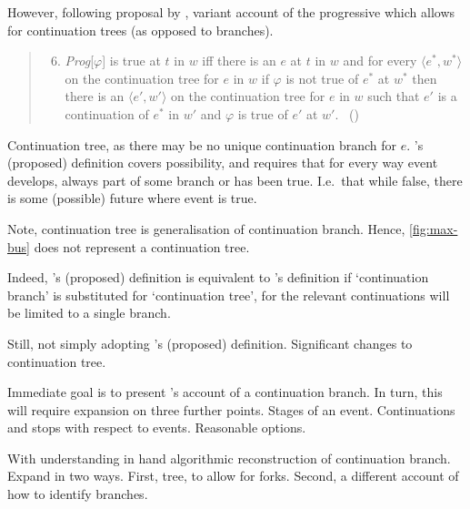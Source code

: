 \begin{note}
  However, following proposal by \citeauthor{Szabo:2004ul}, variant account of the progressive which allows for continuation trees (as opposed to branches).

  \begin{quote}
    \begin{enumerate}[label=(\Roman*), ref=(\Roman*)]
      \setcounter{enumi}{5}
    \item
      \emph{Prog}[\(\varphi\)] is true at \(t\) in \(w\) iff there is an \(e\) at \(t\) in \(w\) and for every \(\langle e^{\ast}, w^{\ast} \rangle\) on the continuation tree for \(e\) in \(w\) if \(\varphi\) is not true of \(e^{\ast}\) at \(w^{\ast}\) then there is an \(\langle e', w' \rangle\) on the continuation tree for \(e\) in \(w\) such that \(e'\) is a continuation of \(e^{\ast}\) in \(w'\) and \(\varphi\) is true of \(e'\) at \(w'\).%
      \mbox{ }\hfill\mbox{(\citeyear[37]{Szabo:2004ul})}
    \end{enumerate}
  \end{quote}

  Continuation tree, as there may be no unique continuation branch for \(e\).
  \citeauthor{Szabo:2004ul}'s (proposed) definition covers possibility, and requires that for every way event develops, always part of some branch or has been true.
  I.e.\ that while false, there is some (possible) future where event is true.

  Note, continuation tree is generalisation of continuation branch.
  Hence, \autoref{fig:max-bus} does not represent a continuation tree.

  Indeed, \citeauthor{Szabo:2004ul}'s (proposed) definition is equivalent to \citeauthor{Landman:1992wh}'s definition if `continuation branch' is substituted for `continuation tree', for the relevant continuations will be limited to a single branch.

  Still, not simply adopting \citeauthor{Szabo:2004ul}'s (proposed) definition.
  Significant changes to continuation tree.
\end{note}

\begin{note}
  Immediate goal is to present \citeauthor{Landman:1992wh}'s account of a continuation branch.
  In turn, this will require expansion on three further points.
  Stages of an event.
  Continuations and stops with respect to events.
  Reasonable options.

  With understanding in hand algorithmic reconstruction of continuation branch.
  Expand in two ways.
  First, tree, to allow for forks.
  Second, a different account of how to identify branches.
\end{note}

